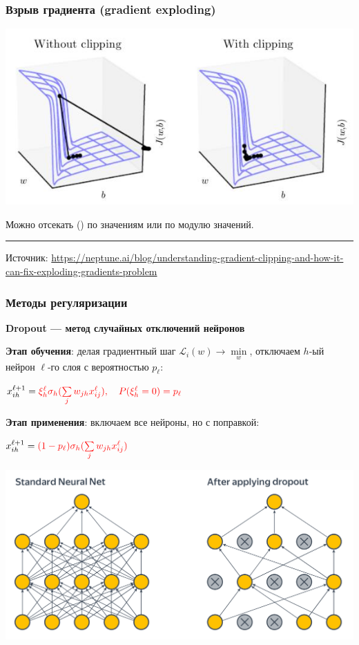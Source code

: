 \documentclass[fullscreen=true, bookmarks=true, hyperref={pdfencoding=unicode}]{beamer}
\begin{document}
\begin{frame}
  \frametitle{Взрыв градиента (gradient exploding)}
  \begin{center}
    \includegraphics[keepaspectratio,
                     width=0.6\paperwidth]{gradient_exploding.jpg}
  \end{center}
  Можно отсекать () по значениям или по модулю значений.

  \noindent\rule{8cm}{0.4pt}

  Источник: \href{https://neptune.ai/blog/understanding-gradient-clipping-and-how-it-can-fix-exploding-gradients-problem}{https://neptune.ai/blog/understanding-gradient-clipping-and-how-it-can-fix-exploding-gradients-problem}
\end{frame}


\begin{frame}
  \frametitle{Методы регуляризации}

  {\bf Dropout — метод случайных отключений нейронов}

  {\bf Этап обучения}: делая градиентный шаг $\mathcal{L}_i(w) \to \min\limits_w$, отключаем $h$-ый нейрон $\ell$-го слоя с вероятностью $p_\ell$:

  $x_{ih}^{\ell + 1} = \color{red}{\xi_h^\ell} \sigma_h (\sum\limits_j w_{jh} x_{ij}^\ell), \ \ \
   \color{red}{P(\xi_h^\ell = 0) = p_\ell}$

  {\bf Этап применения}: включаем все нейроны, но с поправкой:

  $x_{ih}^{\ell + 1} = \color{red}{(1 - p_\ell)} \sigma_h(\sum\limits_j w_{jh} x_{ij}^\ell)$

  \begin{center}
    \includegraphics[keepaspectratio,
                     width=.6\paperwidth]{dropout_shad.png}
  \end{center}
\end{frame}
\end{document}
